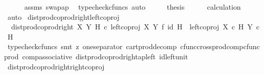 \begin{isabellebody}
\ \ \ \ \isamarkupfalse%
\ assms\ swap{\isacharunderscore}{\kern0pt}ap\ \isamarkupfalse%
\ {\isacharparenleft}{\kern0pt}typecheck{\isacharunderscore}{\kern0pt}cfuncs{\isacharcomma}{\kern0pt}\ auto{\isacharparenright}{\kern0pt}\isanewline
\ \ \isamarkupfalse%
\ \isamarkupfalse%
\ {\isacharquery}{\kern0pt}thesis\isanewline
\ \ \ \ \isamarkupfalse%
\ calculation\ \isamarkupfalse%
\ auto\isanewline
{}\isamarkupfalse%
%
\endisatagproof
{\isafoldproof}%
%
\isadelimproof
\isanewline
%
\endisadelimproof
\isanewline
{}\isamarkupfalse%
\ dist{\isacharunderscore}{\kern0pt}prod{\isacharunderscore}{\kern0pt}coprod{\isacharunderscore}{\kern0pt}right{\isacharunderscore}{\kern0pt}left{\isacharunderscore}{\kern0pt}coproj{\isacharcolon}{\kern0pt}\isanewline
\ \ {\isachardoublequoteopen}dist{\isacharunderscore}{\kern0pt}prod{\isacharunderscore}{\kern0pt}coprod{\isacharunderscore}{\kern0pt}right\ X\ Y\ H\ {\isasymcirc}\isactrlsub c\ {\isacharparenleft}{\kern0pt}left{\isacharunderscore}{\kern0pt}coproj\ X\ Y\ {\isasymtimes}\isactrlsub f\ id\ H{\isacharparenright}{\kern0pt}\ {\isacharequal}{\kern0pt}\ left{\isacharunderscore}{\kern0pt}coproj\ {\isacharparenleft}{\kern0pt}X\ {\isasymtimes}\isactrlsub c\ H{\isacharparenright}{\kern0pt}\ {\isacharparenleft}{\kern0pt}Y\ {\isasymtimes}\isactrlsub c\ H{\isacharparenright}{\kern0pt}{\isachardoublequoteclose}\isanewline
%
\isadelimproof
\ \ %
\endisadelimproof
%
\isatagproof
{}\isamarkupfalse%
\ {\isacharparenleft}{\kern0pt}typecheck{\isacharunderscore}{\kern0pt}cfuncs{\isacharcomma}{\kern0pt}\ smt\ {\isacharparenleft}{\kern0pt}z{}{\isacharparenright}{\kern0pt}\ one{\isacharunderscore}{\kern0pt}separator\ cart{\isacharunderscore}{\kern0pt}prod{\isacharunderscore}{\kern0pt}decomp\ cfunc{\isacharunderscore}{\kern0pt}cross{\isacharunderscore}{\kern0pt}prod{\isacharunderscore}{\kern0pt}comp{\isacharunderscore}{\kern0pt}cfunc{\isacharunderscore}{\kern0pt}prod\ comp{\isacharunderscore}{\kern0pt}associative{}\ dist{\isacharunderscore}{\kern0pt}prod{\isacharunderscore}{\kern0pt}coprod{\isacharunderscore}{\kern0pt}right{\isacharunderscore}{\kern0pt}ap{\isacharunderscore}{\kern0pt}left\ id{\isacharunderscore}{\kern0pt}left{\isacharunderscore}{\kern0pt}unit{}{\isacharparenright}{\kern0pt}%
\endisatagproof
{\isafoldproof}%
%
\isadelimproof
\isanewline
%
\endisadelimproof
\isanewline
{}\isamarkupfalse%
\ dist{\isacharunderscore}{\kern0pt}prod{\isacharunderscore}{\kern0pt}coprod{\isacharunderscore}{\kern0pt}right{\isacharunderscore}{\kern0pt}right{\isacharunderscore}{\kern0pt}coproj{\isacharcolon}{\kern0pt}\isanewline

\end{isabellebody}
